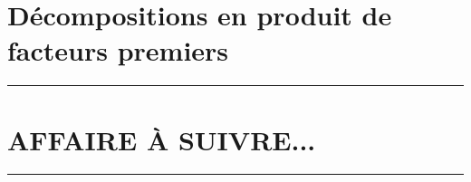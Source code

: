 \documentclass[12pt]{amsart}
\begin{document}
\section{Décompositions en produit de facteurs premiers}





%
%
%
%
%
%
%
%
%
%
%
%
%
%
%


\bigskip

\hrule

\section{AFFAIRE À SUIVRE...}

\bigskip

\hrule

%
%
%
%
%
%
\end{document}
